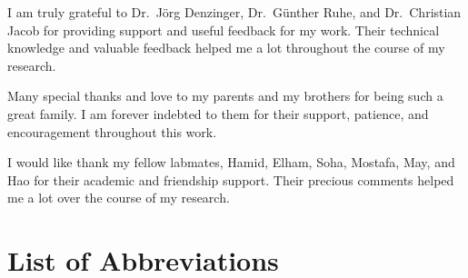 \documentclass{ucalgthes1}
\theoremstyle{plain}
\theoremstyle{definition}
\begin{document}
I am truly grateful to Dr.~J{\"o}rg Denzinger, Dr.~G\"{u}nther Ruhe, and Dr.~Christian Jacob for providing support and useful feedback for my work. Their technical knowledge and valuable feedback helped me a lot throughout the course of my research.

Many special thanks and love to my parents and my brothers for being such a great family. I am forever indebted to them for their support, patience, and encouragement throughout this work.


I would like thank my fellow labmates, Hamid, Elham, Soha, Mostafa, May, and Hao for their academic and friendship support. Their precious comments helped me a lot over the course of my research.


\begin{singlespace}
\newpage
{}
\tableofcontents
\pagestyle{plain}
\newpage
{}
\listoftables
\pagestyle{plain}
\newpage
{}
\listoffigures
\pagestyle{plain}
\clearpage
\clearpage          %
\end{singlespace}
\newpage
{}
\chapter*{\bf{List of Abbreviations}\hfill}
\listofsymbols
\pagestyle{plain}
\clearpage



\setcounter{page}{1}










\end{document}
